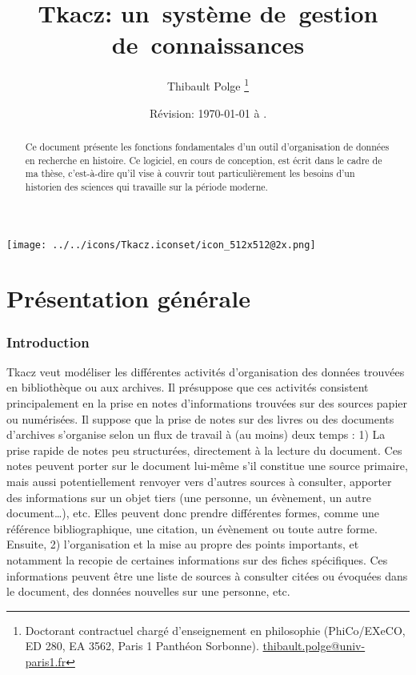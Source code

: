 \documentclass[11pt]{article}
\begin{document}
\title{Tkacz: un~système de~gestion de~connaissances}

\author{Thibault Polge%
\thanks{Doctorant contractuel chargé d'enseignement en philosophie (PhiCo/EXeCO, ED
280, EA 3562, Paris 1 Panthéon Sorbonne). \protect\href{http://mailto:thibault.polge@univ-paris1.fr}{thibault.polge@univ-paris1.fr}%
}}

\date{Révision: \today{} à \currenttime.}

\maketitle

\begin{abstract}
Ce document présente les fonctions fondamentales d'un outil d'organisation
de données en recherche en histoire. Ce logiciel, en cours de conception,
est écrit dans le cadre de ma thèse, c'est-à-dire qu'il vise à couvrir
tout particulièrement les besoins d'un historien des sciences qui
travaille sur la période moderne.
\end{abstract}
\begin{center}\texttt{[image: ../../icons/Tkacz.iconset/icon\_512x512@2x.png]}\end{center}

\bigskip\begin{spacing}{.7}
\makeatletter
    \setcounter{tocdepth}{2}
\makeatother
\end{spacing}

\clearpage

\part{Présentation générale}

\section{Introduction}\label{introduction}

Tkacz veut modéliser les différentes activités d'organisation des
données trouvées en bibliothèque ou aux archives. Il présuppose que ces
activités consistent principalement en la prise en notes d'informations
trouvées sur des sources papier ou numérisées. Il suppose que la prise
de notes sur des livres ou des documents d'archives s'organise selon un
flux de travail à (au moins) deux temps : 1) La prise rapide de notes
peu structurées, directement à la lecture du document. Ces notes peuvent
porter sur le document lui-même s'il constitue une source primaire, mais
aussi potentiellement renvoyer vers d'autres sources à consulter,
apporter des informations sur un objet tiers (une personne, un
évènement, un autre document\ldots{}), etc. Elles peuvent donc prendre
différentes formes, comme une référence bibliographique, une citation,
un évènement ou toute autre forme. Ensuite, 2) l'organisation et la mise
au propre des points importants, et notamment la recopie de certaines
informations sur des fiches spécifiques. Ces informations peuvent être
une liste de sources à consulter citées ou évoquées dans le document,
des données nouvelles sur une personne, etc.
\end{document}
